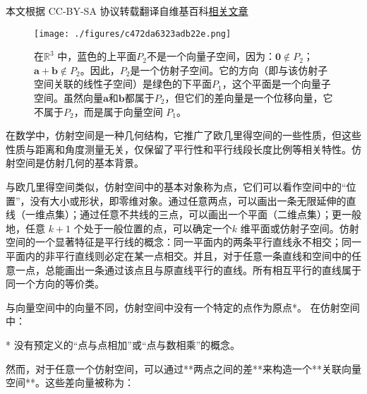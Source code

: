 
本文根据 CC-BY-SA 协议转载翻译自维基百科\href{https://en.wikipedia.org/wiki/Affine_space}{相关文章}

\begin{figure}[ht]
\centering
\texttt{[image: ./figures/c472da6323adb22e.png]}
\caption{在$\mathbb{R}^3$ 中，蓝色的上平面$P_2$不是一个向量子空间，因为：$\mathbf{0} \notin P_2$；$\mathbf{a} + \mathbf{b} \notin P_2$。因此，$P_2$是一个仿射子空间。它的方向（即与该仿射子空间关联的线性子空间）是绿色的下平面$P_1$，这个平面是一个向量子空间。虽然向量$\mathbf{a}$和$\mathbf{b}$都属于$P_2$，但它们的差向量是一个位移向量，它不属于$P_2$，而是属于向量空间 $P_1$。} \label{fig_FSKJ_1}
\end{figure}
在数学中，仿射空间是一种几何结构，它推广了欧几里得空间的一些性质，但这些性质与距离和角度测量无关，仅保留了平行性和平行线段长度比例等相关特性。仿射空间是仿射几何的基本背景。

与欧几里得空间类似，仿射空间中的基本对象称为点，它们可以看作空间中的“位置”，没有大小或形状，即零维对象。通过任意两点，可以画出一条无限延伸的直线（一维点集）；通过任意不共线的三点，可以画出一个平面（二维点集）；更一般地，任意 $k+1$ 个处于一般位置的点，可以确定一个$k$ 维平面或仿射子空间。仿射空间的一个显著特征是平行线的概念：同一平面内的两条平行直线永不相交；同一平面内的非平行直线则必定在某一点相交。并且，对于任意一条直线和空间中的任意一点，总能画出一条通过该点且与原直线平行的直线。所有相互平行的直线属于同一个方向的等价类。

与向量空间中的向量不同，仿射空间中没有一个特定的点作为原点*。
在仿射空间中：

* 没有预定义的“点与点相加”或“点与数相乘”的概念。

然而，对于任意一个仿射空间，可以通过**两点之间的差**来构造一个**关联向量空间**。这些差向量被称为：

